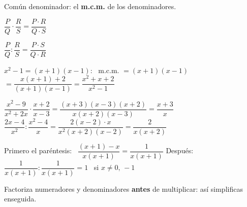 \documentclass[11pt,a4paper]{article}
\newcommand{\comic}{\fontfamily{ComicNeue-TLF}\selectfont}
\newcommand{\nota}[1]{{\comic\small\color{fmex!85!black}#1}}
\begin{document}
\vfill
\begin{tcbraster}[raster columns=3,raster equal height,raster column skip=8pt]
\begin{tcolorbox}[fmbase,colback=fmdefbg,colframe=fmdef,coltitle=white,title={Suma y resta}]
Común denominador: el \textbf{m.c.m.} de los denominadores.
\end{tcolorbox}
\begin{tcolorbox}[fmbase,colback=fmdefbg,colframe=fmdef,coltitle=white,title={Producto},before upper=\centering]
$\dfrac PQ\cdot\dfrac RS=\dfrac{P\cdot R}{Q\cdot S}$
\end{tcolorbox}
\begin{tcolorbox}[fmbase,colback=fmdefbg,colframe=fmdef,coltitle=white,title={Cociente},before upper=\centering]
$\dfrac PQ:\dfrac RS=\dfrac{P\cdot S}{Q\cdot R}$
\end{tcolorbox}
\end{tcbraster}

\vfill
\begin{exemple}
$x^2-1=(x+1)(x-1)$: \ m.c.m. $=(x+1)(x-1)$ \qquad $=\dfrac{x(x+1)+2}{(x+1)(x-1)}=\boxed{\dfrac{x^2+x+2}{x^2-1}}$
\end{exemple}

\vfill
\begin{exemple}
$\dfrac{x^2-9}{x^2+2x}\cdot\dfrac{x+2}{x-3}=\dfrac{(x+3)(x-3)(x+2)}{x(x+2)(x-3)}=\boxed{\dfrac{x+3}{x}}$ \qquad
$\dfrac{2x-4}{x^2}:\dfrac{x^2-4}{x}=\dfrac{2(x-2)\cdot x}{x^2(x+2)(x-2)}=\boxed{\dfrac{2}{x(x+2)}}$
\end{exemple}

\vfill
\begin{exemple}
Primero el paréntesis: \ $\dfrac{(x+1)-x}{x(x+1)}=\dfrac{1}{x(x+1)}$ \qquad Después: \ $\dfrac{1}{x(x+1)}:\dfrac{1}{x(x+1)}=\boxed{1}$ \ \nota{si $x\neq0,\,-1$}
\end{exemple}

\vfill
\begin{truc}
Factoriza numeradores y denominadores \textbf{antes} de multiplicar: así simplificas enseguida.
\end{truc}

\vfill
\end{document}
